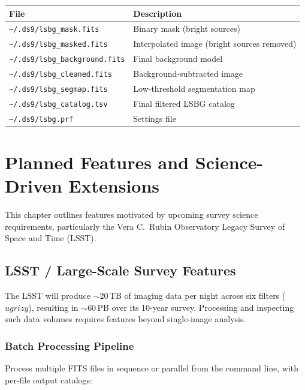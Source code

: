 \documentclass[11pt,fleqn]{book}
\begin{document}
\begin{center}
\begin{tabular}{ll}
\toprule
\textbf{File} & \textbf{Description} \\
\midrule
\texttt{\textasciitilde/.ds9/lsbg\_mask.fits} & Binary mask (bright sources) \\
\texttt{\textasciitilde/.ds9/lsbg\_masked.fits} & Interpolated image (bright sources removed) \\
\texttt{\textasciitilde/.ds9/lsbg\_background.fits} & Final background model \\
\texttt{\textasciitilde/.ds9/lsbg\_cleaned.fits} & Background-subtracted image \\
\texttt{\textasciitilde/.ds9/lsbg\_segmap.fits} & Low-threshold segmentation map \\
\texttt{\textasciitilde/.ds9/lsbg\_catalog.tsv} & Final filtered LSBG catalog \\
\texttt{\textasciitilde/.ds9/lsbg.prf} & Settings file \\
\bottomrule
\end{tabular}
\end{center}


\chapter{Planned Features and Science-Driven Extensions}
\label{ch:future}

This chapter outlines features motivated by upcoming survey science requirements, particularly the Vera C.\ Rubin Observatory Legacy Survey of Space and Time (LSST).

\section{LSST / Large-Scale Survey Features}

The LSST will produce $\sim$20\,TB of imaging data per night across six filters ($ugrizy$), resulting in $\sim$60\,PB over its 10-year survey. Processing and inspecting such data volumes requires features beyond single-image analysis.

\subsection{Batch Processing Pipeline}

Process multiple FITS files in sequence or parallel from the command line, with per-file output catalogs:
\end{document}
